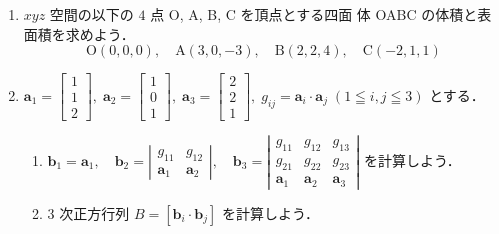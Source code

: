 \documentclass[11pt, uplatex, dvipdfmx]{jsarticle}
\begin{document}
\begin{enumerate}[label=\ref{sec:determinant}.\arabic*]
\item $xyz$ 空間の以下の $4$ 点 O, A, B, C を頂点とする四面
  体 OABC の体積と表面積を求めよう．
  \[
    \textrm{O}(0,0,0), \quad \textrm{A}(3,0,-3), \quad \textrm{B}(2,2,4), \quad \textrm{C}(-2,1,1)
  \]


\item $\bm{a}_1=\left[
    \begin{array}{r}
      1\\
      1\\
      2
    \end{array}
  \right], \; \bm{a}_2=\left[
    \begin{array}{r}
      1\\
      0\\
      1
    \end{array}
  \right], \; \bm{a}_3=\left[
    \begin{array}{r}
      2\\
      2\\
      1
    \end{array}
  \right], \; g_{ij} = \bm{a}_i \cdot \bm{a}_j \; (1 \leqq i,j \leqq 3)$ とする．

  \vspace{1zh}

  \begin{enumerate}[label=(\arabic*)]
    \setlength{\itemsep}{1ex}
    
  \item $\bm{b}_1 = \bm{a}_1, \quad \bm{b}_2= \left|
      \begin{array}{cc}
        g_{11} & g_{12}\\
        \bm{a}_1 & \bm{a}_2
      \end{array}
    \right|, \quad \bm{b}_3 = \left|
      \begin{array}{ccc}
        g_{11} & g_{12} & g_{13}\\
        g_{21} & g_{22} & g_{23}\\
        \bm{a}_1 & \bm{a}_2 & \bm{a}_3
      \end{array}
    \right|$ を計算しよう．

  \item $3$ 次正方行列 $B=\left[ \bm{b}_i \cdot \bm{b}_j\right]$ を計算しよう．
  \end{enumerate}
\end{enumerate}
\end{document}
